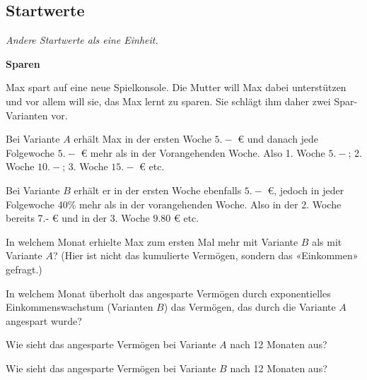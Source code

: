 
\subsection{Startwerte}
\textit{Andere Startwerte als eine Einheit.}


\bbwActAufgabenNr{} \textbf{Sparen}

Max spart auf eine neue Spielkonsole. Die Mutter will Max dabei unterstützen und vor allem will sie, das Max lernt zu sparen.
Sie schlägt ihm daher zwei Spar-Varianten vor.

Bei Variante $A$ erhält Max in der ersten Woche $5.-$ \euro{} und danach jede Folgewoche $5.-$ \euro{} mehr als in der Vorangehenden Woche. Also 1. Woche $5.-$; 2. Woche $10.-$; 3. Woche $15.-$ \euro{} etc.

Bei Variante $B$ erhält er in der ersten Woche ebenfalls $5.-$ \euro{}, jedoch in jeder Folgewoche 40\% mehr als in der vorangehenden Woche. Also in der 2. Woche \zB bereits 7.- \euro{} und in der 3. Woche $9.80$ \euro{} etc.


\begin{bbwAufgabenBlock}
\item In welchem Monat erhielte Max zum ersten Mal mehr mit Variante $B$ als mit Variante $A$? (Hier ist nicht das kumulierte Vermögen, sondern das «Einkommen» gefragt.)

\item In welchem Monat überholt das angesparte Vermögen durch exponentielles Einkommenswachstum (Varianten $B$) das Vermögen, das durch die Variante $A$ angespart wurde?

\item Wie sieht das angesparte Vermögen bei Variante $A$ nach 12 Monaten aus?

\item Wie sieht das angesparte Vermögen bei Variante $B$ nach 12 Monaten aus?
\end{bbwAufgabenBlock}
\platzFuerBerechnungenBisEndeSeite{}


